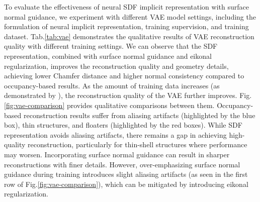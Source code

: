 To evaluate the effectiveness of neural SDF implicit representation with surface normal guidance, we experiment with different VAE model settings, including the formulation of neural implicit representation, training supervision, and training dataset.
Tab.\ref{tab:vae} demonstrates the qualitative results of VAE reconstruction quality with different training settings.
We can observe that the SDF representation, combined with surface normal guidance and eikonal regularization, improves the reconstruction quality and geometry details, achieving lower Chamfer distance and higher normal consistency compared to occupancy-based results.
As the amount of training data increases (as demonstrated by \method{}), the reconstruction quality of the VAE further improves.
Fig.\ref{fig:vae-comparison} provides qualitative comparisons between them.
Occupancy-based reconstruction results suffer from aliasing artifacts (highlighted by the blue box), thin structures, and floaters (highlighted by the red boxes).
While SDF representation avoids aliasing artifacts, there remains a gap in achieving high-quality reconstruction, particularly for thin-shell structures where performance may worsen. 
Incorporating surface normal guidance can result in sharper reconstructions with finer details. However, over-emphasizing surface normal guidance during training introduces slight aliasing artifacts (as seen in the first row of Fig.\ref{fig:vae-comparison}), which can be mitigated by introducing eikonal regularization.



\begin{table}[t]
\begin{center}
\caption{The ablation for data quality and quantity.}
\vspace{1em}
\label{tab: data_abaltion}
\begin{sc}
\end{sc}
\end{center}
\vspace{-2em}
\end{table}
